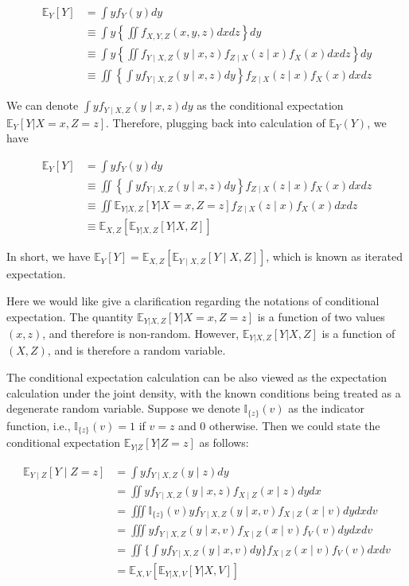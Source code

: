 \documentclass[
]{book}
\begin{document}
\[ \begin{aligned}
\mathbb{E}_Y[Y] & =\int y f_Y(y) d y \\
& \equiv \int y\left\{\iint f_{X, Y, Z}(x, y, z) d x d z\right\} d y \\
& \equiv \int y\left\{\iint f_{Y \mid X, Z}(y \mid x, z) f_{Z \mid X}(z \mid x) f_X(x) d x d z\right\} d y \\
& \equiv \iint\left\{\int y f_{Y \mid X, Z}(y \mid x, z) d y\right\} f_{Z \mid X}(z \mid x) f_X(x) d x d z
\end{aligned} \]

We can denote \(\int y f_{Y \mid X, Z}(y \mid x, z) d y\) as the conditional expectation \(\mathbb{E}_{Y}[Y|X=x,Z=z]\). Therefore, plugging back into calculation of \(\mathbb{E}_Y(Y)\), we have

\[ \begin{aligned}
\mathbb{E}_Y[Y] & =\int y f_Y(y) d y \\
& \equiv \iint\left\{\int y f_{Y \mid X, Z}(y \mid x, z) d y\right\} f_{Z \mid X}(z \mid x) f_X(x) d x d z\\
& \equiv \iint  \mathbb{E}_{Y|X,Z}[Y|X=x,Z=z] f_{Z \mid X}(z \mid x) f_X(x) d x dz \\
& \equiv \mathbb{E}_{X,Z}[\mathbb{E}_{Y|X,Z}[Y|X,Z]]
\end{aligned} \]

In short, we have \(\mathbb{E}_Y[Y]=\mathbb{E}_{X, Z}\left[\mathbb{E}_{Y \mid X, Z}[Y \mid X, Z]\right]\), which is known as iterated expectation.

Here we would like give a clarification regarding the notations of conditional expectation. The quantity \(\mathbb{E}_{Y|X,Z}[Y|X=x,Z=z]\) is a function of two values \((x,z)\), and therefore is non-random. However, \(\mathbb{E}_{Y|X,Z}[Y|X,Z]\) is a function of \((X,Z)\), and is therefore a random variable.

The conditional expectation calculation can be also viewed as the expectation calculation under the joint density, with the known conditions being treated as a degenerate random variable. Suppose we denote \(\mathbb{I}_{\{z\}}(v)\) as the indicator function, i.e., \(\mathbb{I}_{\{z\}}(v)=1\) if \(v=z\) and 0 otherwise. Then we could state the conditional expectation \(\mathbb{E}_{Y|Z}[Y|Z=z]\) as follows:

\[ \begin{aligned}
\mathbb{E}_{Y \mid Z}[Y \mid Z=z] & =\int y f_{Y \mid X, Z}(y \mid z) d y \\
& =\iint y f_{Y \mid X, Z}(y \mid x, z) f_{X \mid Z}(x \mid z) d y d x \\
& =\iiint \mathbb{I}_{\{z\}}(v) y f_{Y \mid X, Z}(y \mid x, v) f_{X \mid Z}(x \mid v) d y d x d v\\
& =\iiint  y f_{Y \mid X, Z}(y \mid x, v) f_{X \mid Z}(x \mid v) f_V(v) d y d x d v \\
& =\iint  \{ \int y f_{Y \mid X, Z}(y \mid x, v) dy \} f_{X \mid Z}(x \mid v) f_V(v) d x d v \\
& = \mathbb{E}_{X,V}[\mathbb{E}_{Y|X,V}[Y|X,V]]
\end{aligned} \]
\end{document}
